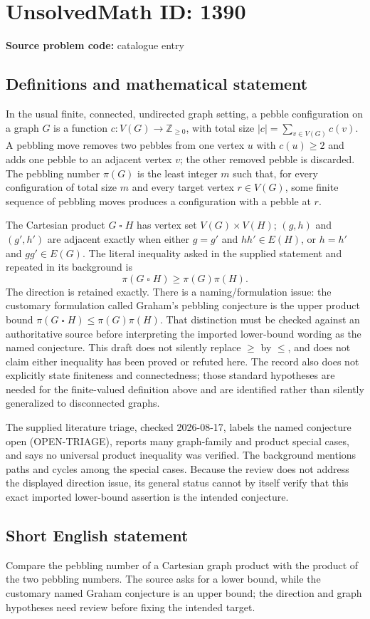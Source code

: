 \documentclass[11pt]{article}
\newcommand{\Z}{\mathbb{Z}}
\begin{document}
\section*{UnsolvedMath ID: 1390}
\textbf{Source problem code:} catalogue entry
\subsection{Definitions and mathematical statement}
In the usual finite, connected, undirected graph setting, a pebble configuration on a graph $G$ is a function $c:V(G)\to\Z_{\geq0}$, with total size $|c|=\sum_{v\in V(G)}c(v)$. A pebbling move removes two pebbles from one vertex $u$ with $c(u)\geq2$ and adds one pebble to an adjacent vertex $v$; the other removed pebble is discarded. The pebbling number $\pi(G)$ is the least integer $m$ such that, for every configuration of total size $m$ and every target vertex $r\in V(G)$, some finite sequence of pebbling moves produces a configuration with a pebble at $r$.

The Cartesian product $G\mathbin{\square}H$ has vertex set $V(G)\times V(H)$; $(g,h)$ and $(g',h')$ are adjacent exactly when either $g=g'$ and $hh'\in E(H)$, or $h=h'$ and $gg'\in E(G)$. The literal inequality asked in the supplied statement and repeated in its background is
\[\pi(G\mathbin{\square}H)\geq\pi(G)\pi(H).\]
The direction is retained exactly. There is a naming/formulation issue: the customary formulation called Graham's pebbling conjecture is the upper product bound $\pi(G\mathbin{\square}H)\leq\pi(G)\pi(H)$. That distinction must be checked against an authoritative source before interpreting the imported lower-bound wording as the named conjecture. This draft does not silently replace $\geq$ by $\leq$, and does not claim either inequality has been proved or refuted here. The record also does not explicitly state finiteness and connectedness; those standard hypotheses are needed for the finite-valued definition above and are identified rather than silently generalized to disconnected graphs.

The supplied literature triage, checked 2026-08-17, labels the named conjecture open (OPEN-TRIAGE), reports many graph-family and product special cases, and says no universal product inequality was verified. The background mentions paths and cycles among the special cases. Because the review does not address the displayed direction issue, its general status cannot by itself verify that this exact imported lower-bound assertion is the intended conjecture.
\subsection{Short English statement}
Compare the pebbling number of a Cartesian graph product with the product of the two pebbling numbers. The source asks for a lower bound, while the customary named Graham conjecture is an upper bound; the direction and graph hypotheses need review before fixing the intended target.
\end{document}

